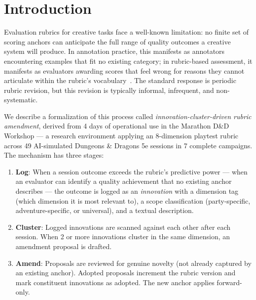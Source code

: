 
\section{Introduction}
\label{sec:introduction}

Evaluation rubrics for creative tasks face a well-known limitation: no finite set of
scoring anchors can anticipate the full range of quality outcomes a creative system
will produce. In annotation practice, this manifests as annotators encountering examples
that fit no existing category; in rubric-based assessment, it manifests as evaluators
awarding scores that feel wrong for reasons they cannot articulate within the rubric's
vocabulary~\cite{andrade2000, boud2013assessment}. The standard response is periodic
rubric revision, but this revision is typically informal, infrequent, and non-systematic.

We describe a formalization of this process called \textit{innovation-cluster-driven
rubric amendment}, derived from 4 days of operational use in the Marathon D\&D Workshop
--- a research environment applying an 8-dimension playtest rubric across 49
AI-simulated Dungeons \& Dragons 5e sessions in 7 complete campaigns. The mechanism
has three stages:

\begin{enumerate}
  \item \textbf{Log}: When a session outcome exceeds the rubric's predictive power ---
        when an evaluator can identify a quality achievement that no existing anchor
        describes --- the outcome is logged as an \textit{innovation} with a dimension
        tag (which dimension it is most relevant to), a scope classification
        (party-specific, adventure-specific, or universal), and a textual description.

  \item \textbf{Cluster}: Logged innovations are scanned against each other after each
        session. When 2 or more innovations cluster in the same dimension, an amendment
        proposal is drafted.

  \item \textbf{Amend}: Proposals are reviewed for genuine novelty (not already captured
        by an existing anchor). Adopted proposals increment the rubric version and mark
        constituent innovations as adopted. The new anchor applies forward-only.
\end{enumerate}

